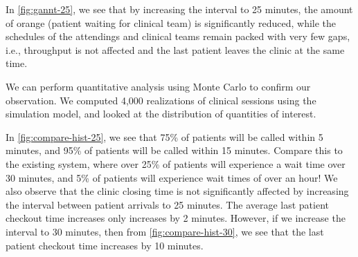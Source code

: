 \documentclass[11pt]{article}
\begin{document}
In \cref{fig:gannt-25}, we see that by increasing the interval to 25 minutes, the amount of orange (patient waiting for clinical team) is significantly reduced, while the schedules of the attendings and clinical teams remain packed with very few gaps, i.e., throughput is not affected and the last patient leaves the clinic at the same time.

We can perform quantitative analysis using Monte Carlo to confirm our observation. We computed 4,000 realizations of clinical sessions using the simulation model, and looked at the distribution of quantities of interest.

In \cref{fig:compare-hist-25}, we see that 75\% of patients will be called within 5 minutes, and 95\% of patients will be called within 15 minutes. Compare this to the existing system, where over 25\% of patients will experience a wait time over 30 minutes, and 5\% of patients will experience wait times of over an hour! We also observe that the clinic closing time is not significantly affected by increasing the interval between patient arrivals to 25 minutes. The average last patient checkout time increases only increases by 2 minutes. However, if we increase the interval to 30 minutes, then from \cref{fig:compare-hist-30}, we see that the last patient checkout time increases by 10 minutes.
\end{document}
